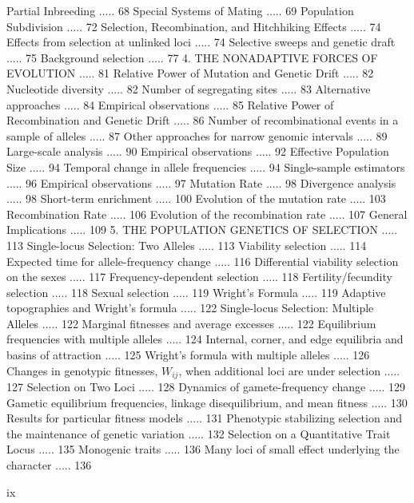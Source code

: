 \documentclass{article}
\begin{document}
Partial Inbreeding ..... 68
Special Systems of Mating ..... 69
Population Subdivision ..... 72
Selection, Recombination, and Hitchhiking Effects ..... 74
Effects from selection at unlinked loci ..... 74
Selective sweeps and genetic draft ..... 75
Background selection ..... 77
4. THE NONADAPTIVE FORCES OF EVOLUTION ..... 81
Relative Power of Mutation and Genetic Drift ..... 82
Nucleotide diversity ..... 82
Number of segregating sites ..... 83
Alternative approaches ..... 84
Empirical observations ..... 85
Relative Power of Recombination and Genetic Drift ..... 86
Number of recombinational events in a sample of alleles ..... 87
Other approaches for narrow genomic intervals ..... 89
Large-scale analysis ..... 90
Empirical observations ..... 92
Effective Population Size ..... 94
Temporal change in allele frequencies ..... 94
Single-sample estimators ..... 96
Empirical observations ..... 97
Mutation Rate ..... 98
Divergence analysis ..... 98
Short-term enrichment ..... 100
Evolution of the mutation rate ..... 103
Recombination Rate ..... 106
Evolution of the recombination rate ..... 107
General Implications ..... 109
5. THE POPULATION GENETICS OF SELECTION ..... 113
Single-locus Selection: Two Alleles ..... 113
Viability selection ..... 114
Expected time for allele-frequency change ..... 116
Differential viability selection on the sexes ..... 117
Frequency-dependent selection ..... 118
Fertility/fecundity selection ..... 118
Sexual selection ..... 119
Wright's Formula ..... 119
Adaptive topographies and Wright's formula ..... 122
Single-locus Selection: Multiple Alleles ..... 122
Marginal fitnesses and average excesses ..... 122
Equilibrium frequencies with multiple alleles ..... 124
Internal, corner, and edge equilibria and basins of attraction ..... 125
Wright's formula with multiple alleles ..... 126
Changes in genotypic fitnesses,  $ W_{ij} $, when additional loci are under selection ..... 127
Selection on Two Loci ..... 128
Dynamics of gamete-frequency change ..... 129
Gametic equilibrium frequencies, linkage disequilibrium, and mean fitness ..... 130
Results for particular fitness models ..... 131
Phenotypic stabilizing selection and the maintenance of genetic variation ..... 132
Selection on a Quantitative Trait Locus ..... 135
Monogenic traits ..... 136
Many loci of small effect underlying the character ..... 136

ix
\end{document}
